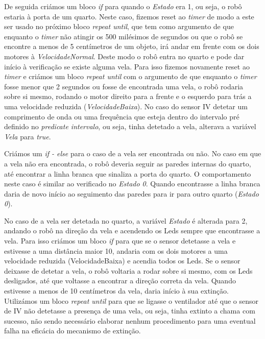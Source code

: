 \documentclass[pdftex,12pt,a4paper]{report}
\begin{document}
\newpage
De seguida criámos um bloco \emph{if} para quando o \emph{Estado} era 1, ou seja, o robô estaria à porta de um quarto. Neste caso, fizemos reset ao \emph{timer} de modo a este ser usado no próximo bloco \emph{repeat until}, que tem como argumento de que enquanto o \emph{timer} não atingir os 500 milésimos de segundos ou que o robô se encontre a menos de 5 centímetros de um objeto, irá andar em frente com os dois motores à \emph{VelocidadeNormal}. Deste modo o robô entra no quarto e pode dar início à verificação se existe alguma vela. Para isso fizemos novamente reset ao \emph{timer} e criámos um bloco \emph{repeat until} com o argumento de que enquanto o \emph{timer} fosse menor que 2 segundos ou fosse de encontrada uma vela, o robô rodaria sobre si mesmo, rodando o motor direito para a frente e o esquerdo para trás a uma velocidade reduzida (\emph{VelocidadeBaixa}). No caso do sensor IV detetar um comprimento de onda ou uma frequência que esteja dentro do intervalo pré definido no \emph{predicate intervalo}\footnotemark{}, ou seja, tinha detetado a vela, alterava a variável \emph{Vela} para \emph{true}.

Criámos um \emph{if - else} para o caso de a vela ser encontrada ou não. No caso em que a vela não era encontrada, o robô deveria seguir as paredes internas do quarto, até encontrar a linha branca que sinaliza a porta do quarto. O comportamento neste caso é similar ao verificado no \emph{Estado 0}. Quando encontrasse a linha branca daria de novo início ao seguimento das paredes para ir para outro quarto (\emph{Estado 0}).

No caso de a vela ser detetada no quarto, a variável \emph{Estado} é alterada para 2, andando o robô na direção da vela e acendendo os Leds sempre que encontrasse a vela. Para isso criámos um bloco \emph{if} para que se o sensor detetasse a vela e estivesse a uma distância maior 10, andaria com os dois motores a uma velocidade reduzida (VelocidadeBaixa) e acendia todos os Leds. Se o sensor deixasse de detetar a vela, o robô voltaria a rodar sobre si mesmo, com os Leds desligados, até que voltasse a encontrar a direção correta da vela. Quando estivesse a menos de 10 centímetros da vela, daria início à sua extinção. Utilizámos um bloco \emph{repeat until} para que se ligasse o ventilador até que o sensor de IV não detetasse a presença de uma vela, ou seja, tinha extinto a chama com sucesso, não sendo necessário elaborar nenhum procedimento para uma eventual falha na eficácia do mecanismo de extinção.
\end{document}
